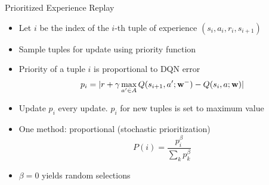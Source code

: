 \documentclass[aspectratio=169]{../latex_main/tntbeamer}  %
\begin{document}
\begin{frame}[c]{Prioritized Experience Replay~}
	
	\begin{itemize}
		\item Let $i$ be the index of the $i$-th tuple of experience $(s_i,a_i,r_i,s_{i+1})$
		\item Sample tuples for update using priority function
		\item Priority of a tuple $i$ is proportional to DQN error
		$$ p_i = | r + \gamma \max_{a' \in A} Q(s_{i+1}, a'; \mathbf{w}^-) - Q(s_i,a;\mathbf{w}) |$$
		\item Update $p_i$ every update. $p_i$ for new tuples is set to maximum value
		\item One method: proportional (stochastic prioritization)
		$$ P(i) = \frac{p_i^\beta}{\sum_k p_k^\beta}$$
		\item $\beta = 0$ yields random selections 
	\end{itemize}
	
\end{frame}
\end{document}
